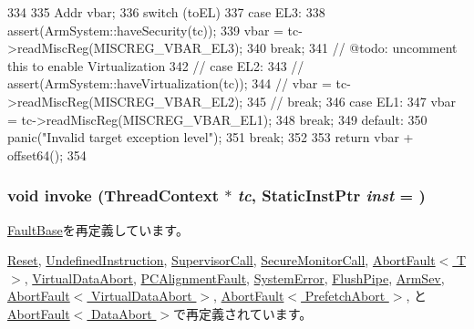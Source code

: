 \begin{DoxyCode}
334 {
335     Addr vbar;
336     switch (toEL) {
337       case EL3:
338         assert(ArmSystem::haveSecurity(tc));
339         vbar = tc->readMiscReg(MISCREG_VBAR_EL3);
340         break;
341       // @todo: uncomment this to enable Virtualization
342       // case EL2:
343       //   assert(ArmSystem::haveVirtualization(tc));
344       //   vbar = tc->readMiscReg(MISCREG_VBAR_EL2);
345       //   break;
346       case EL1:
347         vbar = tc->readMiscReg(MISCREG_VBAR_EL1);
348         break;
349       default:
350         panic("Invalid target exception level");
351         break;
352     }
353     return vbar + offset64();
354 }
\end{DoxyCode}
\hypertarget{classArmISA_1_1ArmFault_a2bd783b42262278d41157d428e1f8d6f}{
\subsubsection[{invoke}]{\setlength{\rightskip}{0pt plus 5cm}void invoke ({\bf ThreadContext} $\ast$ {\em tc}, \/  {\bf StaticInstPtr} {\em inst} = {})}}
\label{classArmISA_1_1ArmFault_a2bd783b42262278d41157d428e1f8d6f}


\hyperlink{classFaultBase_a2bd783b42262278d41157d428e1f8d6f}{FaultBase}を再定義しています。

\hyperlink{classArmISA_1_1Reset_a2bd783b42262278d41157d428e1f8d6f}{Reset}, \hyperlink{classArmISA_1_1UndefinedInstruction_a2bd783b42262278d41157d428e1f8d6f}{UndefinedInstruction}, \hyperlink{classArmISA_1_1SupervisorCall_a2bd783b42262278d41157d428e1f8d6f}{SupervisorCall}, \hyperlink{classArmISA_1_1SecureMonitorCall_a2bd783b42262278d41157d428e1f8d6f}{SecureMonitorCall}, \hyperlink{classArmISA_1_1AbortFault_a2bd783b42262278d41157d428e1f8d6f}{AbortFault$<$ T $>$}, \hyperlink{classArmISA_1_1VirtualDataAbort_a38260dc6f5fb9598eaf95d8696e3efe8}{VirtualDataAbort}, \hyperlink{classArmISA_1_1PCAlignmentFault_a2bd783b42262278d41157d428e1f8d6f}{PCAlignmentFault}, \hyperlink{classArmISA_1_1SystemError_a2bd783b42262278d41157d428e1f8d6f}{SystemError}, \hyperlink{classArmISA_1_1FlushPipe_a2bd783b42262278d41157d428e1f8d6f}{FlushPipe}, \hyperlink{classArmISA_1_1ArmSev_a2bd783b42262278d41157d428e1f8d6f}{ArmSev}, \hyperlink{classArmISA_1_1AbortFault_a2bd783b42262278d41157d428e1f8d6f}{AbortFault$<$ VirtualDataAbort $>$}, \hyperlink{classArmISA_1_1AbortFault_a2bd783b42262278d41157d428e1f8d6f}{AbortFault$<$ PrefetchAbort $>$}, と \hyperlink{classArmISA_1_1AbortFault_a2bd783b42262278d41157d428e1f8d6f}{AbortFault$<$ DataAbort $>$}で再定義されています。


